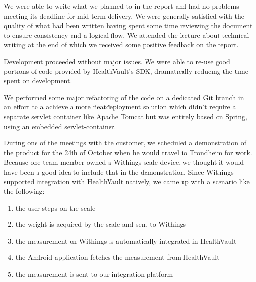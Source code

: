 We were able to write what we planned to in the report and had no problems meeting its deadline for
mid-term delivery. We were generally satisfied with the quality of what had
been written having spent some time reviewing the document to ensure consistency and a logical flow.
We attended the lecture about technical writing at the end of which we received some positive
feedback on the report.%

Development proceeded without major issues. We were able to re-use good portions of code provided
by HealthVault's SDK, dramatically reducing the time spent on development. %

We performed some major refactoring of the code on a dedicated Git branch in an effort
to a achieve a more \'neat\' deployment solution which didn't require a separate servlet container like
Apache Tomcat but was entirely based on Spring, using an embedded servlet-container.

During one of the meetings with the customer, we scheduled a demonstration of the product
for the 24th of October when he would travel to Trondheim for work.
Because one team member owned a Withings scale device, we thought it would have been
a good idea to include that in the demonstration.
Since Withings supported integration with HealthVault natively, we came up with a scenario
like the following:
\begin{enumerate}[1)]
\item the user steps on the scale
\item the weight is acquired by the scale and sent to Withings
\item the measurement on Withings is automatically integrated in HealthVault
\item the Android application fetches the measurement from HealthVault
\item the measurement is sent to our integration platform
\end{enumerate}


